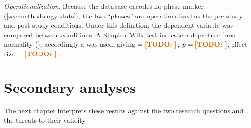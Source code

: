 \emph{Operationalization.} Because the database encodes no phase marker
(\cref{sec:methodology-stats}), the two ``phases'' are operationalized as
the pre-study and post-study conditions. Under this definition, the
dependent variable  was compared between conditions.
A Shapiro--Wilk test \citep{shapiro1965}  indicate a
departure from normality (); accordingly a
 was used, giving  $= \todo{}$,
$p = \todo{}$, effect size $= \todo{}$
\citep{mann1947, cohen1988}. 

\section{Secondary analyses}
\label{sec:results-secondary}


\medskip
\noindent The next chapter interprets these results against the two
research questions and the threats to their validity.
